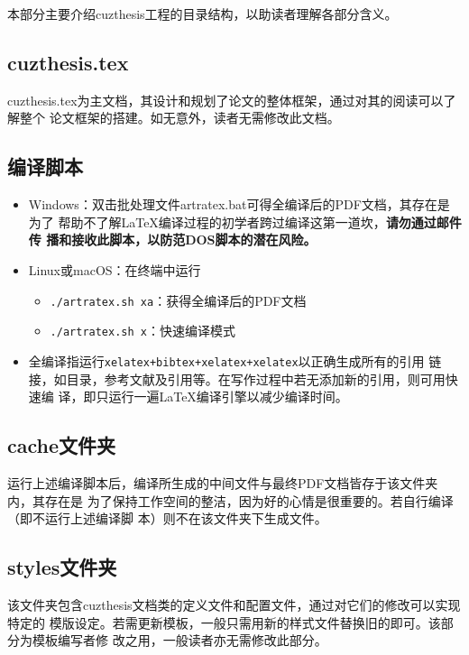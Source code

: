 本部分主要介绍cuzthesis工程的目录结构，以助读者理解各部分含义。

\subsection{cuzthesis.tex}

cuzthesis.tex为主文档，其设计和规划了论文的整体框架，通过对其的阅读可以了解整个
论文框架的搭建。如无意外，读者无需修改此文档。

\subsection{编译脚本}

\begin{itemize}
    \item Windows：双击批处理文件artratex.bat可得全编译后的PDF文档，其存在是为了
    帮助不了解\LaTeX{}编译过程的初学者跨过编译这第一道坎，\textbf{请勿通过邮件传
    播和接收此脚本，以防范DOS脚本的潜在风险。}
    \item Linux或macOS：在终端中运行
        \begin{itemize}
            \item \verb|./artratex.sh xa|：获得全编译后的PDF文档
            \item \verb|./artratex.sh x|：快速编译模式
        \end{itemize}
    \item 全编译指运行\verb|xelatex+bibtex+xelatex+xelatex|以正确生成所有的引用
    链接，如目录，参考文献及引用等。在写作过程中若无添加新的引用，则可用快速编
    译，即只运行一遍\LaTeX{}编译引擎以减少编译时间。
\end{itemize}

\subsection{cache文件夹}

运行上述编译脚本后，编译所生成的中间文件与最终PDF文档皆存于该文件夹内，其存在是
为了保持工作空间的整洁，因为好的心情是很重要的。若自行编译（即不运行上述编译脚
本）则不在该文件夹下生成文件。

\subsection{styles文件夹}

该文件夹包含cuzthesis文档类的定义文件和配置文件，通过对它们的修改可以实现特定的
模版设定。若需更新模板，一般只需用新的样式文件替换旧的即可。该部分为模板编写者修
改之用，一般读者亦无需修改此部分。

